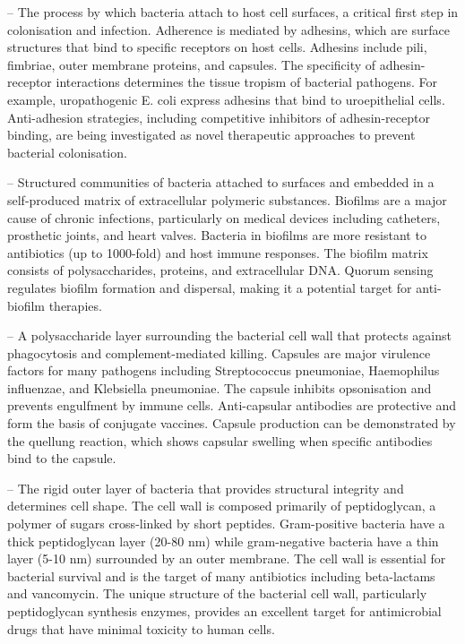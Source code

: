 -- The process by which bacteria attach to host cell surfaces, a critical first step in colonisation and infection. Adherence is mediated by adhesins, which are surface structures that bind to specific receptors on host cells. Adhesins include pili, fimbriae, outer membrane proteins, and capsules. The specificity of adhesin-receptor interactions determines the tissue tropism of bacterial pathogens. For example, uropathogenic E. coli express adhesins that bind to uroepithelial cells. Anti-adhesion strategies, including competitive inhibitors of adhesin-receptor binding, are being investigated as novel therapeutic approaches to prevent bacterial colonisation.

-- Structured communities of bacteria attached to surfaces and embedded in a self-produced matrix of extracellular polymeric substances. Biofilms are a major cause of chronic infections, particularly on medical devices including catheters, prosthetic joints, and heart valves. Bacteria in biofilms are more resistant to antibiotics (up to 1000-fold) and host immune responses. The biofilm matrix consists of polysaccharides, proteins, and extracellular DNA. Quorum sensing regulates biofilm formation and dispersal, making it a potential target for anti-biofilm therapies.

-- A polysaccharide layer surrounding the bacterial cell wall that protects against phagocytosis and complement-mediated killing. Capsules are major virulence factors for many pathogens including Streptococcus pneumoniae, Haemophilus influenzae, and Klebsiella pneumoniae. The capsule inhibits opsonisation and prevents engulfment by immune cells. Anti-capsular antibodies are protective and form the basis of conjugate vaccines. Capsule production can be demonstrated by the quellung reaction, which shows capsular swelling when specific antibodies bind to the capsule.

-- The rigid outer layer of bacteria that provides structural integrity and determines cell shape. The cell wall is composed primarily of peptidoglycan, a polymer of sugars cross-linked by short peptides. Gram-positive bacteria have a thick peptidoglycan layer (20-80 nm) while gram-negative bacteria have a thin layer (5-10 nm) surrounded by an outer membrane. The cell wall is essential for bacterial survival and is the target of many antibiotics including beta-lactams and vancomycin. The unique structure of the bacterial cell wall, particularly peptidoglycan synthesis enzymes, provides an excellent target for antimicrobial drugs that have minimal toxicity to human cells.


